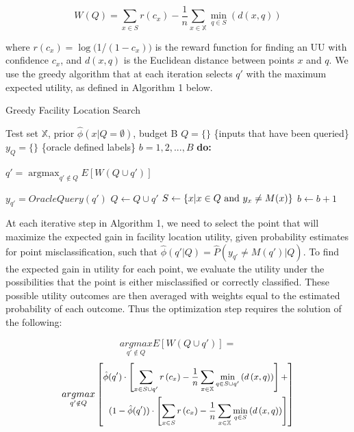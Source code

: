 \documentclass[letterpaper]{article} %
\DeclareMathOperator*{\argmax}{argmax}
\begin{document}
$$W(Q) = \sum_{x \in S} r \left(c_x\right) - \frac{1}{n} \sum_{x \in \mathbb{X}} \min_{q \in S}\left(d\left(x,q\right)\right)$$

where $r\left(c_x\right) = \log($1/$(1-c_x))$ is the reward function for finding an UU with confidence $c_{x}$, and $d(x,q)$ is the Euclidean distance between points $x$ and $q$. We use the greedy algorithm that at each iteration selects $q'$ with the maximum expected utility, as defined in Algorithm 1 below. 

\begin{algorithm}
	\caption{Greedy Facility Location Search}
	\label{alg:Greedy}
	\begin{algorithmic}
		 Test set $\mathbb{X}$, prior $\hat{\phi}\left(x|Q=\emptyset\right)$, budget B
		\STATE $Q=\{\}$ \{inputs that have been queried\}
		\STATE $y_Q = \{\}$ \{oracle defined labels\}
		 $b = 1, 2, ..., B$ {\bfseries do:}

		\STATE $q' = \argmax_{q' \not\in Q} E \left[W\left(Q \cup q'\right) \right]$
		
		\STATE $y_{q'} = OracleQuery(q')$
		\STATE $Q \leftarrow Q \cup q'$
		\STATE $S \leftarrow \left\{x | x \in Q \space \text{ and } y_x \neq M(x) \right\}$
		\STATE $b \leftarrow b + 1$
			

	\end{algorithmic}
\end{algorithm}

At each iterative step in Algorithm 1, we need to select the point that will maximize the expected gain in facility location utility, given probability estimates for point misclassification, such that  $\hat{\phi}(q' | Q) = \hat{P}(y_{q'} \ne M(q' ) |  Q )$. To find the expected gain in utility for each point, we evaluate the utility under the possibilities that the point is either misclassified or correctly classified. These possible utility outcomes are then averaged with weights equal to the estimated probability of each outcome. Thus the optimization step requires the solution of the following:

$$\underset{q' \notin Q}{argmax} E[W(Q \cup q')] = $$
\begin{equation*}
\small
\underset{q' \notin Q}{argmax} \left[\begin{split}
\hat{\phi}(q') \cdot \left[\sum_{x \in S \cup q'} r \left(c_x\right) - \frac{1}{n} \sum_{x \in \mathbb{X}} \min_{q \in S \cup q'}\left(d\left(x,q\right)\right) \right] + \\ 
(1-\hat{\phi}(q')) \cdot \left[\sum_{x \in S} r \left(c_x\right) - \frac{1}{n} \sum_{x \in \mathbb{X}} \min_{q \in S}\left(d\left(x,q\right)\right)\right]  
\end{split}\right]
\end{equation*}
\normalsize
\end{document}
